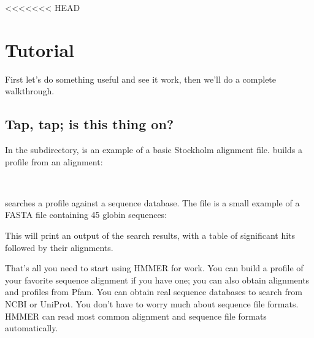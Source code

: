 <<<<<<< HEAD

\chapter{Tutorial}
\label{chapter:tutorial}
\setcounter{footnote}{0}



First let's do something useful and see it work, then we'll do a
complete walkthrough.

\section{Tap, tap; is this thing on?}

In the  subdirectory,  is an example
of a basic Stockholm alignment file.  builds a profile
from an alignment:

  \vspace{1ex}
   \\
  \vspace{1ex}

 searches a profile against a sequence database.  The
file  is a small example of a FASTA file
containing 45 globin sequences:

  \vspace{1ex}
  \vspace{1ex}
  
This will print an output of the search results, with a table of
significant hits followed by their alignments.

That's all you need to start using HMMER for work. You can build
a profile of your favorite sequence alignment if you have one; you can
also obtain alignments and profiles from
Pfam. You can
obtain real sequence databases to search from
NCBI
or
UniProt.
You don't have to worry much about sequence file formats. HMMER can
read most common alignment and sequence file formats
automatically. 
  
